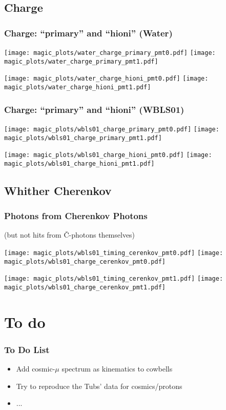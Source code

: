 \documentclass[xcolor=dvipsnames]{beamer}
\begin{document}
\subsection{Charge}

\begin{frame}[fragile]
  \frametitle{Charge: ``primary'' and ``hioni'' (Water)}

\texttt{[image: magic\_plots/water\_charge\_primary\_pmt0.pdf]}%
\texttt{[image: magic\_plots/water\_charge\_primary\_pmt1.pdf]}%

\texttt{[image: magic\_plots/water\_charge\_hioni\_pmt0.pdf]}%
\texttt{[image: magic\_plots/water\_charge\_hioni\_pmt1.pdf]}%
\end{frame}

\begin{frame}[fragile]
  \frametitle{Charge: ``primary'' and ``hioni'' (WBLS01)}

\texttt{[image: magic\_plots/wbls01\_charge\_primary\_pmt0.pdf]}%
\texttt{[image: magic\_plots/wbls01\_charge\_primary\_pmt1.pdf]}%

\texttt{[image: magic\_plots/wbls01\_charge\_hioni\_pmt0.pdf]}%
\texttt{[image: magic\_plots/wbls01\_charge\_hioni\_pmt1.pdf]}%
\end{frame}

\subsection {Whither Cherenkov}

\begin{frame}[fragile]
  \frametitle{Photons from Cherenkov Photons}
  (but not hits from \v{C}-photons themselves)

\texttt{[image: magic\_plots/wbls01\_timing\_cerenkov\_pmt0.pdf]}%
\texttt{[image: magic\_plots/wbls01\_charge\_cerenkov\_pmt0.pdf]}%

\texttt{[image: magic\_plots/wbls01\_timing\_cerenkov\_pmt1.pdf]}%
\texttt{[image: magic\_plots/wbls01\_charge\_cerenkov\_pmt1.pdf]}%

\end{frame}


\section{To do}

\begin{frame}
  \frametitle{To Do List}
  \begin{itemize}
  \item Add cosmic-$\mu$ spectrum as kinematics to cowbells
  \item Try to reproduce the Tubs' data for cosmics/protons
  \item ...
  \end{itemize}
\end{frame}
\end{document}
